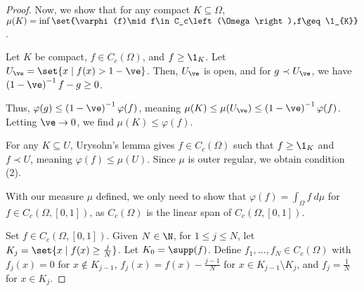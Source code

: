 \documentclass[10pt]{mypackage}
\begin{document}
\begin{proof}
  Now, we show that for any compact $K\subseteq \Omega$, $\mu\!\left(K\right) = \inf\set{\varphi(f)\mid f\in C_c\left(\Omega\right),f\geq \1_{K}}$.\newline

  Let $K$ be compact, $f\in C_c\left(\Omega\right)$, and $f\geq \1_K$. Let $U_{\ve} = \set{x\mid f(x) > 1-\ve}$. Then, $U_{\ve}$ is open, and for $g\prec U_{\ve}$, we have $\left(1-\ve\right)^{-1}f - g \geq 0$.\newline

  Thus, $\varphi(g) \leq \left(1-\ve\right)^{-1}\varphi(f)$, meaning $\mu\!\left(K\right) \leq \mu\!\left(U_{\ve}\right) \leq \left(1-\ve\right)^{-1}\varphi(f)$. Letting $\ve \rightarrow 0$, we find $\mu\!\left(K\right) \leq \varphi(f)$.\newline

  For any $K\subseteq U$, Urysohn's lemma gives $f\in C_c\left(\Omega\right)$ such that $f\geq \1_K$ and $f\prec U$, meaning $\varphi(f) \leq \mu(U)$. Since $\mu$ is outer regular, we obtain condition (2).\newline

  With our measure $\mu$ defined, we only need to show that $\varphi(f) = \int_{\Omega}f\:d\mu$ for $f\in C_c\left(\Omega,[0,1]\right)$, as $C_c\left(\Omega\right)$ is the linear span of $C_c\left(\Omega,[0,1]\right)$.\newline

  Set $f\in C_c\left(\Omega,[0,1]\right)$. Given $N\in \N$, for $1\leq j\leq N$, let $K_j = \set{x\mid f(x) \geq \frac{j}{N}}$. Let $K_0 = \supp(f)$. Define $f_1,\dots,f_N\in C_c\left(\Omega\right)$ with $f_j(x) = 0$ for $x\notin K_{j-1}$, $f_j(x) = f(x) - \frac{j-1}{N}$ for $x\in K_{j-1}\setminus K_j$, and $f_j = \frac{1}{N}$ for $x\in K_j$.\newline


\end{proof}
\end{document}
